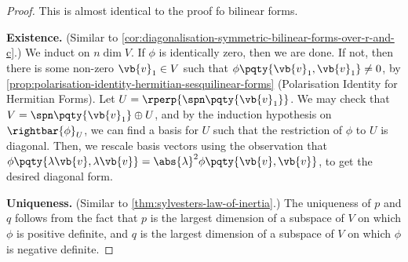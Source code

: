 \begin{proof}
    This is almost identical to the proof fo bilinear forms.

    \textbf{Existence.} (Similar to \autoref{cor:diagonalisation-symmetric-bilinear-forms-over-r-and-c}.) We induct on \(n \dim V\). If \(\phi\) is identically zero, then we are done. If not, then there is some non-zero \(\vb{v}_1 \in V\) such that \(\phi\pqty{\vb{v}_1, \vb{v}_1} \neq 0\), by \autoref{prop:polarisation-identity-hermitian-sesquilinear-forms} (Polarisation Identity for Hermitian Forms). Let \(U = \rperp{\spn\pqty{\vb{v}_1}}\). We may check that \(V = \spn\pqty{\vb{v}_1} \oplus U\), and by the induction hypothesis on \(\rightbar{\phi}_{U}\), we can find a basis for \(U\) such that the restriction of \(\phi\) to \(U\) is diagonal. Then, we rescale basis vectors using the observation that \(\phi\pqty{\lambda \vb{v}, \lambda \vb{v}} = \abs{\lambda}^2 \phi\pqty{\vb{v}, \vb{v}}\), to get the desired diagonal form.

    \textbf{Uniqueness.} (Similar to \autoref{thm:sylvesters-law-of-inertia}.) The uniqueness of \(p\) and \(q\) follows from the fact that \(p\) is the largest dimension of a subspace of \(V\) on which \(\phi\) is positive definite, and \(q\) is the largest dimension of a subspace of \(V\) on which \(\phi\) is negative definite.
\end{proof}